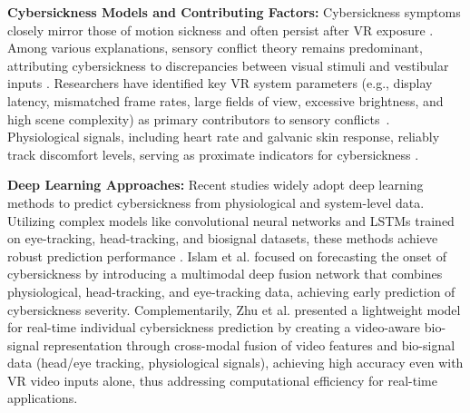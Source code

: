\documentclass{vgtc}                          %
\begin{document}
\textbf{Cybersickness Models and Contributing Factors:}
Cybersickness symptoms closely mirror those of motion sickness and often persist after VR exposure \textcolor{blue}{\cite{Stanney1997CybersicknessIN,stanney2020identifying,mazloumi2018comparative}}. Among various explanations, sensory conflict theory remains predominant, attributing cybersickness to discrepancies between visual stimuli and vestibular inputs \cite{LaVoila10.1145/333329.333344, Cobb6788197}. Researchers have identified key VR system parameters (e.g., display latency, mismatched frame rates, large fields of view, excessive brightness, and high scene complexity) as primary contributors to sensory conflicts~\cite{cobb1999vrise, laviola2000discussion}. Physiological signals, including heart rate and galvanic skin response, reliably track discomfort levels, serving as proximate indicators for cybersickness \cite{kim2021clinical}.

\textbf{Deep Learning Approaches:}
Recent studies widely adopt deep learning methods to predict cybersickness from physiological and system-level data. Utilizing complex models like convolutional neural networks and LSTMs trained on eye-tracking, head-tracking, and biosignal datasets, these methods achieve robust prediction performance \cite{Yalcin2024, Islam9583838}. Islam et al. focused on forecasting the onset of cybersickness by introducing a multimodal deep fusion network that combines physiological, head-tracking, and eye-tracking data, achieving early prediction of cybersickness severity\cite{Islam9583838}. Complementarily, Zhu et al. presented a lightweight model for real-time individual cybersickness prediction by creating a video-aware bio-signal representation through cross-modal fusion of video features and bio-signal data (head/eye tracking, physiological signals), achieving high accuracy even with VR video inputs alone, thus addressing computational efficiency for real-time applications\cite{zhu2025realtimecrossmodalcybersicknessprediction}. 
\end{document}
